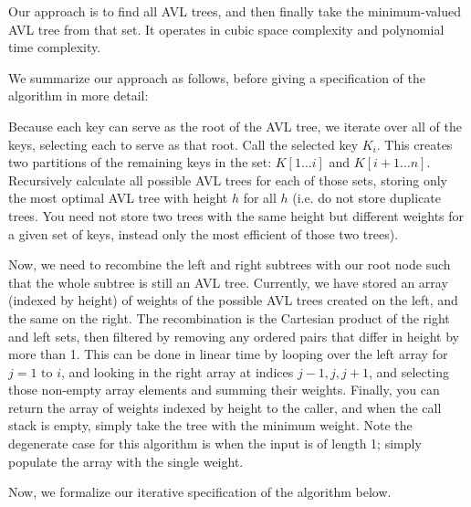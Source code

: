 \documentclass[12pt]{article}
\begin{document}
Our approach is to find all AVL trees, and then finally take the minimum-valued AVL tree from that set. It operates in cubic space complexity and polynomial time complexity.

We summarize our approach as follows, before giving a specification of the algorithm in more detail:

Because each key can serve as the root of the AVL tree, we iterate over all of the keys, selecting each to serve as that root. Call the selected key $K_i$. This creates two partitions of the remaining keys in the set: $K[1\dots i]$ and $K[i+1 \dots n]$. Recursively calculate all possible AVL trees for each of those sets, storing only the most optimal AVL tree with height $h$ for all $h$ (i.e. do not store duplicate trees. You need not store two trees with the same height but different weights for a given set of keys, instead only the most efficient of those two trees). 

Now, we need to recombine the left and right subtrees with our root node such that the whole subtree is still an AVL tree. Currently, we have stored an array (indexed by height) of weights of the possible AVL trees created on the left, and the same on the right. The recombination is the Cartesian product of the right and left sets, then filtered by removing any ordered pairs that differ in height by more than 1. This can be done in linear time by looping over the left array for $j = 1 \text{ to } i$, and looking in the right array at indices $j-1, j, j+1$, and selecting those non-empty array elements and summing their weights. Finally, you can return the array of weights indexed by height to the caller, and when the call stack is empty, simply take the tree with the minimum weight. Note the degenerate case for this algorithm is when the input is of length 1; simply populate the array with the single weight.

Now, we formalize our iterative specification of the algorithm below.
\end{document}
